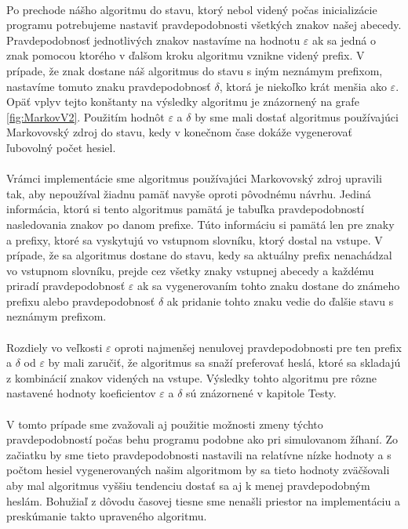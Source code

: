 \paragraph{}
Po prechode nášho algoritmu do stavu, ktorý nebol videný počas inicializácie programu potrebujeme nastaviť pravdepodobnosti všetkých znakov našej abecedy. Pravdepodobnosť jednotlivých znakov nastavíme na hodnotu \(\varepsilon\) ak sa jedná o znak pomocou ktorého v ďalšom kroku algoritmu vznikne videný prefix. V prípade, že znak dostane náš algoritmus do stavu s iným neznámym prefixom, nastavíme tomuto znaku pravdepodobnosť \(\delta\), ktorá je niekoľko krát menšia ako \(\varepsilon\). Opäť vplyv tejto konštanty na výsledky algoritmu je znázornený na grafe \ref{fig:MarkovV2}. Použitím hodnôt \(\varepsilon\) a \(\delta\) by sme mali dostať algoritmus používajúci Markovovský zdroj do stavu, kedy v konečnom čase dokáže vygenerovať ľubovolný počet hesiel.

\paragraph{}
Vrámci implementácie sme algoritmus používajúci Markovovský zdroj upravili tak, aby nepoužíval žiadnu pamäť navyše oproti pôvodnému návrhu. Jediná informácia, ktorú si tento algoritmus pamätá je tabuľka pravdepodobností nasledovania znakov po danom prefixe. Túto informáciu si pamätá len pre znaky a prefixy, ktoré sa vyskytujú vo vstupnom slovníku, ktorý dostal na vstupe. V prípade, že sa algoritmus dostane do stavu, kedy sa aktuálny prefix nenachádzal vo vstupnom slovníku, prejde cez všetky znaky vstupnej abecedy a každému priradí pravdepodobnosť \(\varepsilon\) ak sa vygenerovaním tohto znaku dostane do známeho prefixu alebo pravdepodobnosť \(\delta\) ak pridanie tohto znaku vedie do ďalšie stavu s neznámym prefixom.

\paragraph{}
Rozdiely vo veľkosti \(\varepsilon\) oproti najmenšej nenulovej pravdepodobnosti pre ten prefix a \(\delta\) od \(\varepsilon\) by mali zaručiť, že algoritmus sa snaží preferovať heslá, ktoré sa skladajú z kombinácií znakov videných na vstupe. Výsledky tohto algoritmu pre rôzne nastavené hodnoty koeficientov \(\varepsilon\) a \(\delta\) sú znázornené v kapitole Testy.

\paragraph{}
V tomto prípade sme zvažovali aj použitie možnosti zmeny týchto pravdepodobností počas behu programu podobne ako pri simulovanom žíhaní. Zo začiatku by sme tieto pravdepodobnosti nastavili na relatívne nízke hodnoty a s počtom hesiel vygenerovaných našim algoritmom by sa tieto hodnoty zväčšovali aby mal algoritmus vyššiu tendenciu dostať sa aj k menej pravdepodobným heslám. Bohužiaľ z dôvodu časovej tiesne sme nenašli priestor na implementáciu a preskúmanie takto upraveného algoritmu.